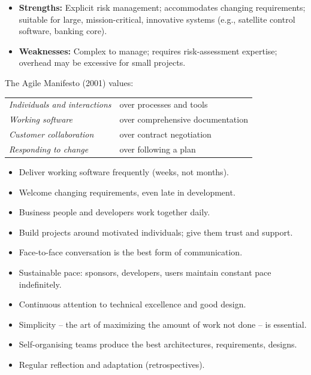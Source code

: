 \documentclass[11pt]{article}
\newcommand{\cle}[1]{{\popxbold\color{popdark}#1}}
\newcounter{popsec}
\newcounter{popsub}
\newcommand{\courssub}[1]{%
  \stepcounter{popsub}%
  \par\vspace{9pt}\noindent{\popxbold\fontsize{11.5}{13}\selectfont\color{popink}{\color{poporange}\thepopsec.\thepopsub}\hspace{6pt}#1}\par\nopagebreak\vspace{4pt}
}
\begin{document}
\begin{propriete}
\begin{itemize}
\item \textbf{Strengths:} Explicit risk management; accommodates changing requirements; suitable for large, mission-critical, innovative systems (e.g., satellite control software, banking core).
\item \textbf{Weaknesses:} Complex to manage; requires risk-assessment expertise; overhead may be excessive for small projects.
\end{itemize}
\end{propriete}

\courssub{Agile Approaches}

The \cle{Agile Manifesto} (2001) values:
\begin{center}
\begin{tabular}{ll}
\emph{Individuals and interactions} & over processes and tools \\
\emph{Working software} & over comprehensive documentation \\
\emph{Customer collaboration} & over contract negotiation \\
\emph{Responding to change} & over following a plan
\end{tabular}
\end{center}

\begin{aretenir}
\begin{itemize}
\item Deliver working software frequently (weeks, not months).
\item Welcome changing requirements, even late in development.
\item Business people and developers work together daily.
\item Build projects around motivated individuals; give them trust and support.
\item Face-to-face conversation is the best form of communication.
\item Sustainable pace: sponsors, developers, users maintain constant pace indefinitely.
\item Continuous attention to technical excellence and good design.
\item Simplicity -- the art of maximizing the amount of work not done -- is essential.
\item Self-organising teams produce the best architectures, requirements, designs.
\item Regular reflection and adaptation (retrospectives).
\end{itemize}
\end{aretenir}
\end{document}
